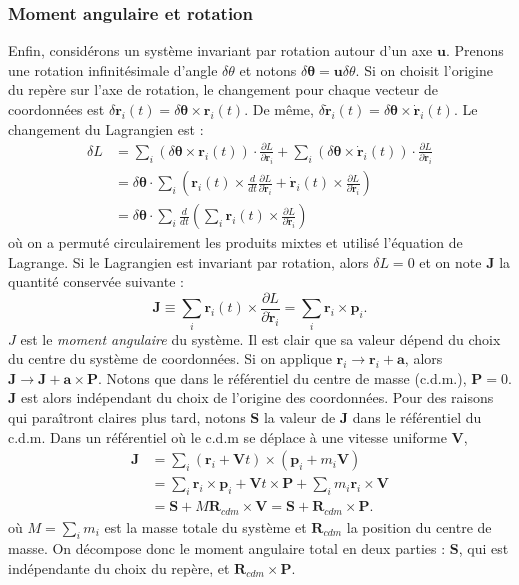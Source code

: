 \subsubsection{Moment angulaire et rotation}
Enfin, considérons un système invariant par rotation autour d'un axe $\bm{u}$. Prenons une rotation infinitésimale d'angle $\delta\theta$ et notons $\delta\bm{\theta}=\bm{u}\delta\theta$. Si on choisit l'origine du repère sur l'axe de rotation, le changement pour chaque vecteur de coordonnées est $\delta\bm{r}_i(t) = \delta\bm{\theta}\times\bm{r}_i(t)$. De même, $\delta\bm{\dot{r}}_i(t) = \delta\bm{\theta}\times\bm{\dot{r}}_i(t)$. Le changement du Lagrangien est :
\begin{align}
\delta L &=\sum_i \left(\delta\bm{\theta}\times\bm{r}_i(t)\right)\cdot\frac{\partial L}{\partial \bm{r}_i}+\sum_i \left(\delta\bm{\theta}\times\bm{\dot{r}}_i(t)\right)\cdot\frac{\partial L}{\partial \bm{\dot{r}}_i}\\
&=\delta\bm{\theta}\cdot\sum_i\left(\bm{r}_i(t)\times\frac{d}{dt}\frac{\partial L}{\partial {\dot{\bm{r}}}_i}
+\bm{\dot{r}}_i(t)\times\frac{\partial L}{\partial \bm{\dot{r}}_i}\right)\\
&=\delta\bm{\theta}\cdot\sum_i\frac{d}{dt}\left(\sum_i \bm{r}_i(t)\times\frac{\partial L}{\partial \bm{\dot{r}}_i}\right)
\end{align}
où on a permuté circulairement les produits mixtes et utilisé l'équation de Lagrange. Si le Lagrangien est invariant par rotation, alors $\delta L = 0$ et on note $\bm{J}$ la quantité conservée suivante :
\begin{equation}
\bm{J}\equiv\sum_i \bm{r}_i(t)\times\frac{\partial L}{\partial \bm{\dot{r}}_i}=\sum_i \bm{r}_i\times\bm{p}_i.
\label{eq:defJ}
\end{equation}
$J$ est le \textit{moment angulaire} du système. Il est clair que sa valeur dépend du choix du centre du système de coordonnées. Si on applique $\bm{r}_i\rightarrow \bm{r}_i+\bm{a}$, alors $\bm{J}\rightarrow \bm{J}+\bm{a}\times\bm{P}$. Notons que dans le référentiel du centre de masse (c.d.m.), $\bm{P}=0$. $\bm{J}$ est alors indépendant du choix de l'origine des coordonnées. Pour des raisons qui paraîtront claires plus tard, notons $\bm{S}$ la valeur de $\bm{J}$ dans le référentiel du c.d.m. Dans un référentiel où le c.d.m se déplace à une vitesse uniforme $\bm{V}$, 
\begin{align}
\bm{J}&=\sum_i \left(\bm{r}_i+\bm{V}t\right)\times\left(\bm{p}_i+m_i\bm{V}\right)\\
&= \sum_i\bm{r}_i\times\bm{p}_i+\bm{V}t\times\bm{P}+\sum_i m_i\bm{r}_i\times\bm{V} \\
&= \bm{S} + M \bm{R}_{cdm}\times\bm{V} = \bm{S} + \bm{R}_{cdm}\times\bm{P}.
\end{align}
où $M=\sum_i m_i$ est la masse totale du système et $\bm{R}_{cdm}$ la position du centre de masse. On décompose donc le moment angulaire total en deux parties : $\bm{S}$, qui est indépendante du choix du repère, et $\bm{R}_{cdm}\times\bm{P}$.

